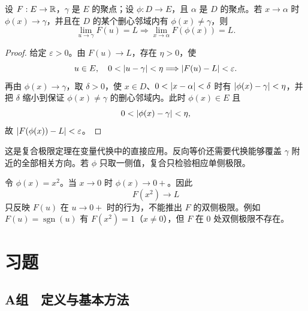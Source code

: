 \begin{proposition}[一般代换的充分条件]
设 \(F:E\to\mathbb{R}\)，\(\gamma\) 是 \(E\) 的聚点；设 \(\phi:D\to E\)，且 \(\alpha\) 是 \(D\) 的聚点。若 \(x\to\alpha\) 时 \(\phi(x)\to\gamma\)，并且在 \(D\) 的某个删心邻域内有 \(\phi(x)\ne\gamma\)，则
\[
 \lim_{u\to\gamma}F(u)=L
 \Longrightarrow
 \lim_{x\to\alpha}F(\phi(x))=L.
\]
\end{proposition}

\begin{proof}
给定 \(\varepsilon>0\)。由 \(F(u)\to L\)，存在 \(\eta>0\)，使
\[
 u\in E,\quad 0<\left|u-\gamma\right|<\eta
 \Longrightarrow \left|F(u)-L\right|<\varepsilon.
\]
再由 \(\phi(x)\to\gamma\)，取 \(\delta>0\)，使 \(x\in D\)、\(0<\left|x-\alpha\right|<\delta\) 时有 \(\left|\phi(x)-\gamma\right|<\eta\)，并把 \(\delta\) 缩小到保证 \(\phi(x)\ne\gamma\) 的删心邻域内。此时 \(\phi(x)\in E\) 且
\[
 0<\left|\phi(x)-\gamma\right|<\eta,
\]
故 \(\left|F(\phi(x))-L\right|<\varepsilon\)。
\end{proof}

这是复合极限定理在变量代换中的直接应用。反向等价还需要代换能够覆盖 \(\gamma\) 附近的全部相关方向。若 \(\phi\) 只取一侧值，复合只检验相应单侧极限。

\begin{counterexample}
令 \(\phi(x)=x^2\)。当 \(x\to0\) 时 \(\phi(x)\to0+\)。因此
\[
 F(x^2)\to L
\]
只反映 \(F(u)\) 在 \(u\to0+\) 时的行为，不能推出 \(F\) 的双侧极限。例如 \(F(u)=\operatorname{sgn}(u)\) 有 \(F(x^2)=1\)（\(x\ne0\)），但 \(F\) 在 \(0\) 处双侧极限不存在。
\end{counterexample}

\section*{习题}

\subsection*{A组　定义与基本方法}


